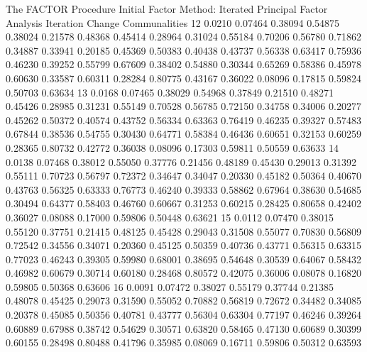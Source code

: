 \documentclass{article}
\begin{document}
\begin{Woutput}
The FACTOR Procedure
Initial Factor Method: Iterated Principal Factor Analysis
Iteration  Change                                   Communalities
   12      0.0210  0.07464  0.38094  0.54875  0.38024  0.21578  0.48368  0.45414  0.28964  0.31024
                   0.55184  0.70206  0.56780  0.71862  0.34887  0.33941  0.20185  0.45369  0.50383
                   0.40438  0.43737  0.56338  0.63417  0.75936  0.46230  0.39252  0.55799  0.67609
                   0.38402  0.54880  0.30344  0.65269  0.58386  0.45978  0.60630  0.33587  0.60311
                   0.28284  0.80775  0.43167  0.36022  0.08096  0.17815  0.59824  0.50703  0.63634
   13      0.0168  0.07465  0.38029  0.54968  0.37849  0.21510  0.48271  0.45426  0.28985  0.31231
                   0.55149  0.70528  0.56785  0.72150  0.34758  0.34006  0.20277  0.45262  0.50372
                   0.40574  0.43752  0.56334  0.63363  0.76419  0.46235  0.39327  0.57483  0.67844
                   0.38536  0.54755  0.30430  0.64771  0.58384  0.46436  0.60651  0.32153  0.60259
                   0.28365  0.80732  0.42772  0.36038  0.08096  0.17303  0.59811  0.50559  0.63633
   14      0.0138  0.07468  0.38012  0.55050  0.37776  0.21456  0.48189  0.45430  0.29013  0.31392
                   0.55111  0.70723  0.56797  0.72372  0.34647  0.34047  0.20330  0.45182  0.50364
                   0.40670  0.43763  0.56325  0.63333  0.76773  0.46240  0.39333  0.58862  0.67964
                   0.38630  0.54685  0.30494  0.64377  0.58403  0.46760  0.60667  0.31253  0.60215
                   0.28425  0.80658  0.42402  0.36027  0.08088  0.17000  0.59806  0.50448  0.63621
   15      0.0112  0.07470  0.38015  0.55120  0.37751  0.21415  0.48125  0.45428  0.29043  0.31508
                   0.55077  0.70830  0.56809  0.72542  0.34556  0.34071  0.20360  0.45125  0.50359
                   0.40736  0.43771  0.56315  0.63315  0.77023  0.46243  0.39305  0.59980  0.68001
                   0.38695  0.54648  0.30539  0.64067  0.58432  0.46982  0.60679  0.30714  0.60180
                   0.28468  0.80572  0.42075  0.36006  0.08078  0.16820  0.59805  0.50368  0.63606
   16      0.0091  0.07472  0.38027  0.55179  0.37744  0.21385  0.48078  0.45425  0.29073  0.31590
                   0.55052  0.70882  0.56819  0.72672  0.34482  0.34085  0.20378  0.45085  0.50356
                   0.40781  0.43777  0.56304  0.63304  0.77197  0.46246  0.39264  0.60889  0.67988
                   0.38742  0.54629  0.30571  0.63820  0.58465  0.47130  0.60689  0.30399  0.60155
                   0.28498  0.80488  0.41796  0.35985  0.08069  0.16711  0.59806  0.50312  0.63593

\end{Woutput}
\end{document}
